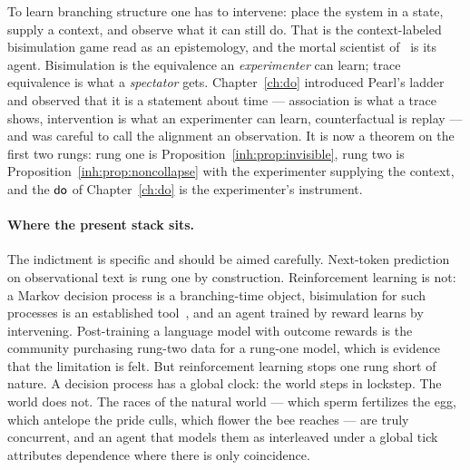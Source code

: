 To learn branching structure one has to intervene: place the system in
a state, supply a context, and observe what it can still do.
That is the context-labeled bisimulation game read as an epistemology,
and the mortal scientist of \chSci\ is its agent.
Bisimulation is the equivalence an \emph{experimenter} can learn; trace
equivalence is what a \emph{spectator} gets.
Chapter~\ref{ch:do} introduced Pearl's ladder and observed that it is a
statement about time --- association is what a trace shows,
intervention is what an experimenter can learn, counterfactual is
replay --- and was careful to call the alignment an observation.
It is now a theorem on the first two rungs: rung one is
Proposition~\ref{inh:prop:invisible}, rung two is
Proposition~\ref{inh:prop:noncollapse} with the experimenter supplying
the context, and the $\textsf{do}$ of Chapter~\ref{ch:do} is the experimenter's
instrument.

\paragraph{Where the present stack sits.}
The indictment is specific and should be aimed carefully.
Next-token prediction on observational text is rung one by
construction.
Reinforcement learning is not: a Markov decision process is a
branching-time object, bisimulation for such processes is an
established tool~\cite{GivanDeanGreig03}, and an agent trained by
reward learns by intervening.
Post-training a language model with outcome rewards is the community
purchasing rung-two data for a rung-one model, which is evidence that
the limitation is felt.
But reinforcement learning stops one rung short of nature.
A decision process has a global clock: the world steps in lockstep.
The world does not.
The races of the natural world --- which sperm fertilizes the egg, which
antelope the pride culls, which flower the bee reaches --- are truly
concurrent, and an agent that models them as interleaved under a global
tick attributes dependence where there is only coincidence.

